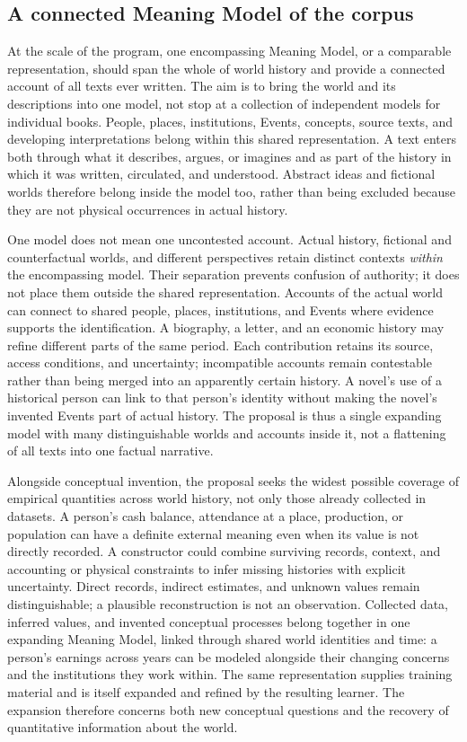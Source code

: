 \documentclass[10pt]{article}
\begin{document}
\subsection{A connected Meaning Model of the corpus}
\label{sec:corpus-model}
At the scale of the program, one encompassing Meaning Model, or a comparable
representation, should span the whole of world history and provide a connected
account of all texts ever written. The aim is to bring the world and its
descriptions into one model, not stop at a collection of independent models
for individual books. People, places, institutions, Events, concepts, source
texts, and developing interpretations belong within this shared representation.
A text enters both through what it describes, argues, or imagines and as part
of the history in which it was written, circulated, and understood. Abstract
ideas and fictional worlds therefore belong inside the model too, rather than
being excluded because they are not physical occurrences in actual history.

One model does not mean one uncontested account. Actual history, fictional and
counterfactual worlds, and different perspectives retain distinct contexts
\emph{within} the encompassing model. Their separation prevents confusion of
authority; it does not place them outside the shared representation. Accounts
of the actual world can connect to shared people, places,
institutions, and Events where evidence supports the identification. A
biography, a letter, and an economic history may refine different parts of the
same period. Each contribution retains its source, access conditions, and
uncertainty; incompatible accounts remain contestable rather than being
merged into an apparently certain history. A novel's use of a historical person
can link to that person's identity without making the novel's invented Events
part of actual history. The proposal is thus a single expanding model with
many distinguishable worlds and accounts inside it, not a flattening of all
texts into one factual narrative.

Alongside conceptual invention, the proposal seeks the widest possible
coverage of empirical quantities across world history, not only those already
collected in datasets. A person's cash balance, attendance at a place,
production, or population can have a definite external meaning even when its
value is not directly recorded. A constructor could combine surviving records,
context, and accounting or physical constraints to infer missing histories
with explicit uncertainty. Direct records, indirect estimates, and unknown
values remain distinguishable; a plausible reconstruction is not an
observation. Collected data, inferred values, and invented conceptual
processes belong together in one expanding Meaning Model, linked through
shared world identities and time: a person's earnings across years can be
modeled alongside their changing concerns and the institutions they work
within. The same representation supplies training material and is itself
expanded and refined by the resulting learner. The expansion therefore
concerns both new conceptual questions and the recovery of quantitative
information about the world.
\end{document}
